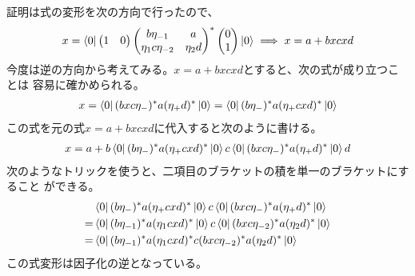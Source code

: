 {	証明は式の変形を次の方向で行ったので、
	\begin{equation*}\begin{split}
		x = \mathinner{\langle{0}|}\begin{pmatrix}
			1 & 0
		\end{pmatrix}\begin{pmatrix}
			b\eta_{-1} & a \\
			\eta_1c\eta_{-2} & \eta_2d \\
		\end{pmatrix}^*\begin{pmatrix}
			0 \\ 1
		\end{pmatrix}\mathinner{|{0}\rangle} \implies x = a + bxcxd
	\end{split}\end{equation*}
	今度は逆の方向から考えてみる。$x=a+bxcxd$とすると、次の式が成り立つことは
	容易に確かめられる。
	\begin{equation*}\begin{split}
		x = \mathinner{\langle{0}|}(bxc\eta_-)^*a(\eta_+d)^*\mathinner{|{0}\rangle}
		= \mathinner{\langle{0}|}(b\eta_-)^*a(\eta_+cxd)^*\mathinner{|{0}\rangle}
	\end{split}\end{equation*}
	この式を元の式$x=a+bxcxd$に代入すると次のように書ける。
	\begin{equation*}\begin{split}
		x = a + b\mathinner{\langle{0}|}(b\eta_-)^*a(\eta_+cxd)^*\mathinner{|{0}\rangle}c
			\mathinner{\langle{0}|}(bxc\eta_-)^*a(\eta_+d)^*\mathinner{|{0}\rangle}d
	\end{split}\end{equation*}
	次のようなトリックを使うと、二項目のブラケットの積を単一のブラケットにすること
	ができる。
	\begin{equation*}\begin{split}
		&\mathinner{\langle{0}|}(b\eta_-)^*a(\eta_+cxd)^*\mathinner{|{0}\rangle}c
			\mathinner{\langle{0}|}(bxc\eta_-)^*a(\eta_+d)^*\mathinner{|{0}\rangle} \\
		=& \mathinner{\langle{0}|}(b\eta_{-1})^*a(\eta_1cxd)^*\mathinner{|{0}\rangle}c
			\mathinner{\langle{0}|}(bxc\eta_{-2})^*a(\eta_2d)^*\mathinner{|{0}\rangle} \\
		=& \mathinner{\langle{0}|}(b\eta_{-1})^*a(\eta_1cxd)^*c
			(bxc\eta_{-2})^*a(\eta_2d)^*\mathinner{|{0}\rangle} \\
	\end{split}\end{equation*}
	この式変形は因子化の逆となっている。

	\begin{todo}[ここまで]\label{todo:ここまで} %
	\end{todo} %

}

